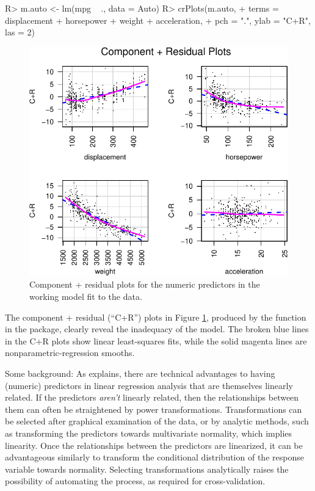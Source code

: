 \documentclass[
]{jss}
\begin{document}
\begin{CodeChunk}
\begin{CodeInput}
R> m.auto <- lm(mpg ~ ., data = Auto)
R> crPlots(m.auto,
+         terms = ~ displacement + horsepower + weight + acceleration,
+         pch = ".", ylab = "C+R", las = 2)
\end{CodeInput}
\begin{figure}

{\centering \includegraphics[width=0.7\linewidth]{jss5535_files/figure-latex/Auto-explore-cr-plots-1}

}

\caption[Component + residual plots for the numeric predictors in the working model fit to the  data]{Component + residual plots for the numeric predictors in the working model fit to the  data.}\label{fig:Auto-explore-cr-plots}
\end{figure}
\end{CodeChunk}

The component + residual (``C+R'') plots in Figure
\ref{fig:Auto-explore-cr-plots}, produced by the 
function in the  package, clearly reveal the inadequacy of the
model. The broken blue lines in the C+R plots show linear least-squares
fits, while the solid magenta lines are nonparametric-regression
smooths.

Some background: As \citet[Sec.~8.2]{Weisberg:2014} explains, there are
technical advantages to having (numeric) predictors in linear regression
analysis that are themselves linearly related. If the predictors
\emph{aren't} linearly related, then the relationships between them can
often be straightened by power transformations. Transformations can be
selected after graphical examination of the data, or by analytic
methods, such as transforming the predictors towards multivariate
normality, which implies linearity. Once the relationships between the
predictors are linearized, it can be advantageous similarly to transform
the conditional distribution of the response variable towards normality.
Selecting transformations analytically raises the possibility of
automating the process, as required for cross-validation.
\end{document}

